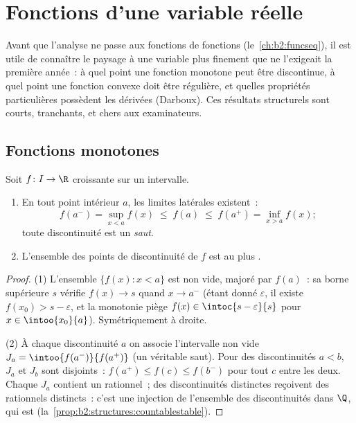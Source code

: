 \chapter{Fonctions d'une variable réelle}\label{ch:b2:realfun}

Avant que l'analyse ne passe aux fonctions de fonctions
(le~\cref{ch:b2:funcseq}), il est utile de connaître le paysage à une
variable plus finement que ne l'exigeait la première année~: à quel
point une fonction monotone peut être discontinue, à quel point une
fonction convexe doit être régulière, et quelles propriétés
particulières possèdent les dérivées (Darboux). Ces résultats
structurels sont courts, tranchants, et chers aux examinateurs.

\section{Fonctions monotones}

\begin{theorem}\label{thm:b2:realfun:monotone}
Soit $f \colon I \to \R$ croissante sur un intervalle.
\begin{enumerate}
  \item En tout point intérieur $a$, les limites latérales existent~:
        \[
        f(a^-) = \sup_{x < a} f(x) \;\leq\; f(a) \;\leq\;
        f(a^+) = \inf_{x > a} f(x) ;
        \]
        toute discontinuité est un \emph{saut}.
  \item L'ensemble des points de discontinuité de $f$ est au plus
        .
\end{enumerate}
\end{theorem}

\begin{proof}
(1) L'ensemble $\{f(x) : x < a\}$ est non vide, majoré par $f(a)$~:
sa borne supérieure $s$ vérifie $f(x) \to s$ quand $x \to a^-$ (étant
donné $\varepsilon$, il existe $f(x_0) > s - \varepsilon$, et la
monotonie piège $f(x) \in \intoc{s - \varepsilon}{s}$ pour $x \in
\intoo{x_0}{a}$). Symétriquement à droite.

(2) À chaque discontinuité $a$ on associe l'intervalle  non vide
$J_a = \intoo{f(a^-)}{f(a^+)}$ (un véritable saut). Pour des
discontinuités $a < b$, $J_a$ et $J_b$ sont disjoints~: $f(a^+) \leq
f(c) \leq f(b^-)$ pour tout $c$ entre les deux. Chaque $J_a$ contient
un rationnel~; des discontinuités distinctes reçoivent des rationnels
distincts~: c'est une injection de l'ensemble des discontinuités dans
$\Q$, qui est 
(la~\cref{prop:b2:structures:countablestable}).
\end{proof}


